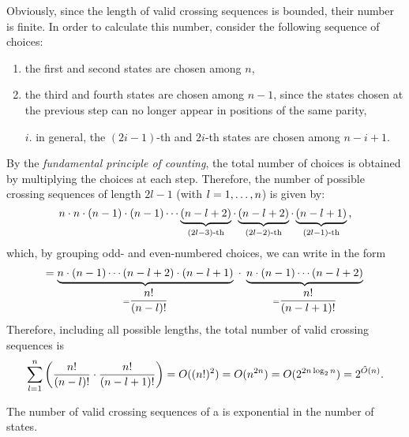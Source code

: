 Obviously, since the length of valid crossing sequences is bounded, their number is finite.
In order to calculate this number, consider the following sequence of choices:
\begin{enumerate}
	\item \label{itm:num-crosseq-1} the first and second states are chosen among $n$,
	\item the third and fourth states are chosen among $n-1$, since the states chosen at the previous step can no longer appear in positions of the same parity,
	\item[$i$.] in general, the $(2i-1)$-th and $2i$-th states are chosen among $n-i+1$.
\end{enumerate}
By the \emph{fundamental principle of counting}, the total number of choices is obtained by multiplying the choices at each step.
Therefore, the number of possible crossing sequences of length $2l-1$ (with $l=1,\dots,n$) is given by:
\begin{equation*}
	n \cdot n \cdot (n-1) \cdot (n-1) \cdots \underbrace{(n-l+2)}_{(2l-3)\text{-th}} \cdot \underbrace{(n-l+2)}_{(2l-2)\text{-th}} \cdot \underbrace{(n-l+1)}_{(2l-1)\text{-th}} \text,
\end{equation*}
which, by grouping odd- and even-numbered choices, we can write in the form
\begin{equation*}
	= \underbrace{n \cdot (n-1) \cdots (n-l+2) \cdot (n-l+1)}_{=\dfrac{n!}{(n-l)!}} \; \cdot \; \underbrace{n \cdot (n-1) \cdots (n-l+2)}_{=\dfrac{n!}{(n-l+1)!}} \\
\end{equation*}
Therefore, including all possible lengths, the total number of valid crossing sequences is
\begin{align*}
	\sum_{l=1}^n \left(\frac{n!}{(n-l)!}\cdot\frac{n!}{(n-l+1)!}\right) = O((n!)^2) = O(n^{2n}) = O(2^{2n \log_2 n}) = 2^{\tilde O(n)} \text.
\end{align*}

\begin{fact}\label{fact:crossing-2DFA-num}
	The number of valid crossing sequences of a \TDFA is exponential in the number of states.
\end{fact}



